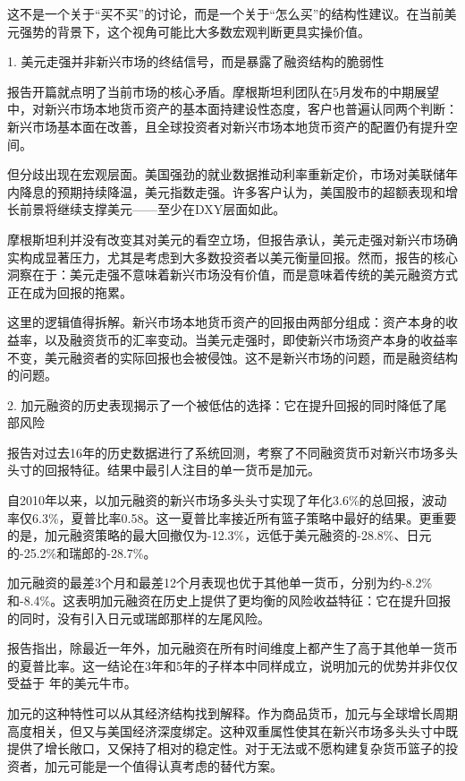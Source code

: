 \documentclass[11pt]{ctexart}
\begin{document}
这不是一个关于“买不买”的讨论，而是一个关于“怎么买”的结构性建议。在当前美元强势的背景下，这个视角可能比大多数宏观判断更具实操价值。

1. 美元走强并非新兴市场的终结信号，而是暴露了融资结构的脆弱性

报告开篇就点明了当前市场的核心矛盾。摩根斯坦利团队在5月发布的中期展望中，对新兴市场本地货币资产的基本面持建设性态度，客户也普遍认同两个判断：新兴市场基本面在改善，且全球投资者对新兴市场本地货币资产的配置仍有提升空间。

但分歧出现在宏观层面。美国强劲的就业数据推动利率重新定价，市场对美联储年内降息的预期持续降温，美元指数走强。许多客户认为，美国股市的超额表现和增长前景将继续支撑美元——至少在DXY层面如此。

摩根斯坦利并没有改变其对美元的看空立场，但报告承认，美元走强对新兴市场确实构成显著压力，尤其是考虑到大多数投资者以美元衡量回报。然而，报告的核心洞察在于：美元走强不意味着新兴市场没有价值，而是意味着传统的美元融资方式正在成为回报的拖累。

这里的逻辑值得拆解。新兴市场本地货币资产的回报由两部分组成：资产本身的收益率，以及融资货币的汇率变动。当美元走强时，即使新兴市场资产本身的收益率不变，美元融资者的实际回报也会被侵蚀。这不是新兴市场的问题，而是融资结构的问题。

2. 加元融资的历史表现揭示了一个被低估的选择：它在提升回报的同时降低了尾部风险

报告对过去16年的历史数据进行了系统回测，考察了不同融资货币对新兴市场多头头寸的回报特征。结果中最引人注目的单一货币是加元。

自2010年以来，以加元融资的新兴市场多头头寸实现了年化3.6\%的总回报，波动率仅6.3\%，夏普比率0.58。这一夏普比率接近所有篮子策略中最好的结果。更重要的是，加元融资策略的最大回撤仅为-12.3\%，远低于美元融资的-28.8\%、日元的-25.2\%和瑞郎的-28.7\%。

加元融资的最差3个月和最差12个月表现也优于其他单一货币，分别为约-8.2\%和-8.4\%。这表明加元融资在历史上提供了更均衡的风险收益特征：它在提升回报的同时，没有引入日元或瑞郎那样的左尾风险。

报告指出，除最近一年外，加元融资在所有时间维度上都产生了高于其他单一货币的夏普比率。这一结论在3年和5年的子样本中同样成立，说明加元的优势并非仅仅受益于 年的美元牛市。

加元的这种特性可以从其经济结构找到解释。作为商品货币，加元与全球增长周期高度相关，但又与美国经济深度绑定。这种双重属性使其在新兴市场多头头寸中既提供了增长敞口，又保持了相对的稳定性。对于无法或不愿构建复杂货币篮子的投资者，加元可能是一个值得认真考虑的替代方案。
\end{document}
